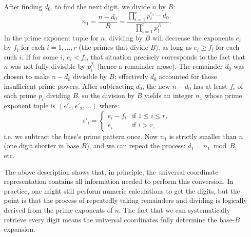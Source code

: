 \documentclass[11pt]{article}
\begin{document}
After finding $d_0$, to find the next digit, we divide $n$ by $B$: 
\[ n_1 = \frac{n - d_0}{B} = \frac{\prod_{i=1}^r p_i^{e_i} - d_0}{\prod_{i=1}^r p_i^{f_i}}. \] 
In the prime exponent tuple for $n$, dividing by $B$ will decrease the exponents $e_i$ by $f_i$ for each $i=1,\dots,r$ (the primes that divide $B$), as long as $e_i \ge f_i$ for each such $i$. If for some $i$, $e_i < f_i$, that situation precisely corresponds to the fact that $n$ was not fully divisible by $p_i^{f_i}$ (hence a remainder arose). The remainder $d_0$ was chosen to make $n - d_0$ divisible by $B$; effectively $d_0$ accounted for those insufficient prime powers. After subtracting $d_0$, the new $n - d_0$ has at least $f_i$ of each prime $p_i$ dividing $B$, so the division by $B$ yields an integer $n_1$ whose prime exponent tuple is $(e'_1, e'_2, \dots)$ where:
\[ e'_i = 
\begin{cases}
e_i - f_i & \text{if } 1 \le i \le r, \\
e_i       & \text{if } i > r,
\end{cases}
\] 
i.e. we subtract the base's prime pattern once. Now $n_1$ is strictly smaller than $n$ (one digit shorter in base $B$), and we can repeat the process: $d_1 = n_1 \bmod B$, etc.

The above description shows that, in principle, the universal coordinate representation contains all information needed to perform this conversion. In practice, one might still perform numeric calculations to get the digits, but the point is that the process of repeatedly taking remainders and dividing is logically derived from the prime exponents of $n$. The fact that we can systematically retrieve every digit means the universal coordinates fully determine the base-$B$ expansion.
\end{document}
